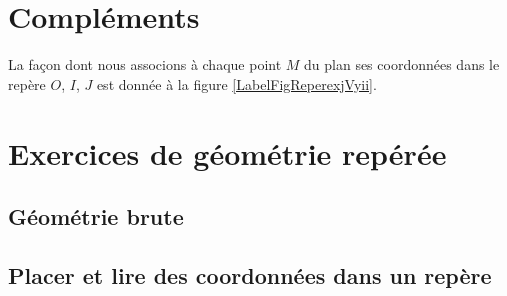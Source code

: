 \section{Compléments}

La façon dont nous associons à chaque point \( M\) du plan ses coordonnées dans le repère \( O\), \( I\), \( J\) est donnée à la figure \ref{LabelFigReperexjVyii}.
\newcommand{\CaptionFigReperexjVyii}{Lire les coordonnées du point \( M\) dans le repère \( OIJ\).}



\section{Exercices de géométrie repérée}

\subsection{Géométrie brute}


\subsection{Placer et lire des coordonnées dans un repère}


